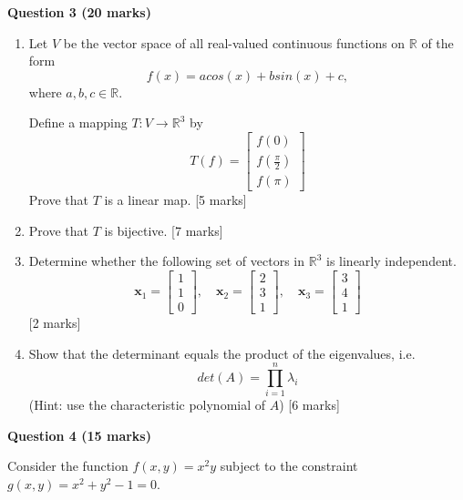 \documentclass{article}
\begin{document}
\bigskip


\textbf{Question 3 (20 marks)}
\begin{enumerate}[label=(\alph*)]
    \item Let $V$ be the vector space of all real-valued continuous functions on $\mathbb{R}$ of the form
    \[
    f(x) = acos(x) + bsin(x) + c,
    \]
    where $a,b,c \in \mathbb{R}$.

    Define a mapping $T : V \rightarrow \mathbb{R}^3$ by
    \[
    T(f) = \left[ \begin{array}{c}
        f(0) \\ f\left(\frac{\pi}{2}\right) \\ f(\pi)
    \end{array}\right]
    \]
    Prove that $T$ is a linear map. [5 marks]
    
    \item Prove that $T$ is bijective. [7 marks]
    
    \item Determine whether the following set of vectors in $\mathbb{R}^3$ is linearly independent. 
    \[
    \bm{x}_1 = \left[ \begin{array}{c}
        1 \\ 1 \\ 0
    \end{array}\right], \quad \bm{x}_2 = \left[ \begin{array}{c}
        2 \\ 3 \\ 1
    \end{array}\right], \quad \bm{x}_3 = \left[ \begin{array}{c}
        3 \\ 4 \\ 1
    \end{array}\right]
    \]
    [2 marks]

    \item Show that the determinant equals the product of the eigenvalues, i.e.
    \[
    det(A) = \prod_{i=1}^n \lambda_i
    \]
    (Hint: use the characteristic polynomial of $A$) [6 marks]
\end{enumerate}

\bigskip


\textbf{Question 4 (15 marks)}

Consider the function $f(x,y)=x^2y$ subject to the constraint $g(x,y) = x^2+y^2-1 = 0$.
\end{document}
